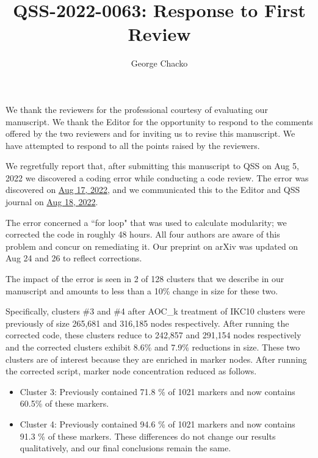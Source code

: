 \documentclass[11pt, oneside]{article}   	%
\title{QSS-2022-0063: Response to First Review}
\author{George Chacko}
\begin{document}
\maketitle
\section*{}

We thank the reviewers for the professional courtesy of evaluating our manuscript. We thank the Editor for the opportunity to respond to the comments 
offered by the two reviewers and for inviting us to revise this manuscript. We have attempted to respond to all the points raised by the reviewers.

We regretfully report that, after submitting this manuscript to QSS on Aug 5, 2022 we discovered a coding error while conducting a code review. The error was discovered 
on \underline{Aug 17, 2022},  and we communicated this to the Editor and QSS journal on \underline{Aug 18, 2022}. 

The error concerned a ``for loop" that was used to calculate modularity; we corrected the code in roughly 48 hours. All four authors are aware of this problem and 
concur on remediating it. Our preprint on arXiv was updated on Aug 24 and 26 to reflect corrections. 

The impact of the error is seen in 2 of 128 clusters  that we describe in our manuscript and amounts to less than a 10\% change in size for these two.
 
Specifically, clusters \#3 and \#4 after AOC\_k treatment of IKC10 clusters were previously of size 265,681 and 316,185 nodes respectively. After running the corrected code, these
clusters reduce to 242,857 and 291,154 nodes respectively and the corrected clusters exhibit 8.6\% and 7.9\% reductions in size. These two clusters are of interest because 
they are  enriched in marker nodes. After running the corrected script, marker node concentration reduced as follows. 


\begin{itemize}
\item Cluster 3: Previously contained 71.8 \% of 1021 markers and now contains 60.5\% of these markers.
\item Cluster 4: Previously contained 94.6 \% of 1021 markers and now contains 91.3 \% of these markers. These differences do not change our results qualitatively, and our final conclusions remain the same. 
\end{itemize}
\end{document}
